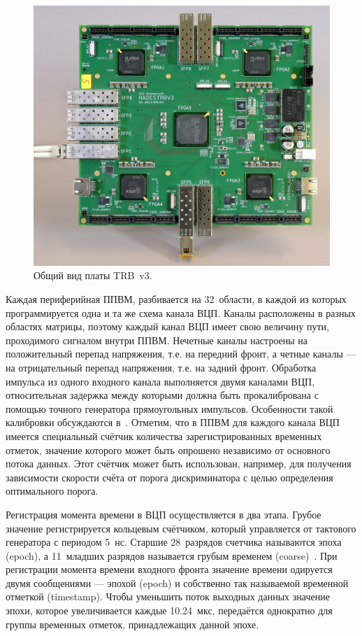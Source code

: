 \begin{figure}
\includegraphics[width=1.0\textwidth]{pictures/7_TRB3_crop.jpg}
\caption{Общий вид платы TRB~v3.}
\label{fig:TRB}
\end{figure}

Каждая периферийная ППВМ, разбивается на 32~области, в каждой из которых программируется одна и та же схема канала ВЦП. Каналы расположены в разных областях матрицы, поэтому каждый канал ВЦП имеет свою величину пути, проходимого сигналом внутри ППВМ. Нечетные каналы настроены на положительный перепад напряжения, т.е. на передний фронт, а четные каналы --- на отрицательный перепад напряжения, т.е. на задний фронт. Обработка импульса из одного входного канала выполняется двумя каналами ВЦП, относительная задержка между которыми должна быть прокалибрована с помощью точного генератора прямоугольных импульсов. Особенности такой калибровки обсуждаются в~\cite{}. Отметим, что в ППВМ для каждого канала ВЦП имеется специальный счётчик количества зарегистрированных временных отметок, значение которого может быть опрошено независимо от основного потока данных. Этот счётчик может быть использован, например, для получения зависимости скорости счёта от порога дискриминатора с целью определения оптимального порога.

Регистрация момента времени в ВЦП осуществляется в два этапа. Грубое значение регистрируется кольцевым счётчиком, который управляется от тактового генератора с периодом 5~нс. Старшие 28~разрядов счетчика называются эпоха (epoch), а 11~младших разрядов называется грубым временем (coarse)~\cite{}. При регистрации момента времени входного фронта значение времени одируется двумя сообщениями --- эпохой (epoch) и собственно так называемой временной отметкой (timestamp). Чтобы уменьшить поток выходных данных значение эпохи, которое увеличивается каждые 10.24~мкс, передаётся однократно для группы временных отметок, принадлежащих данной эпохе.

